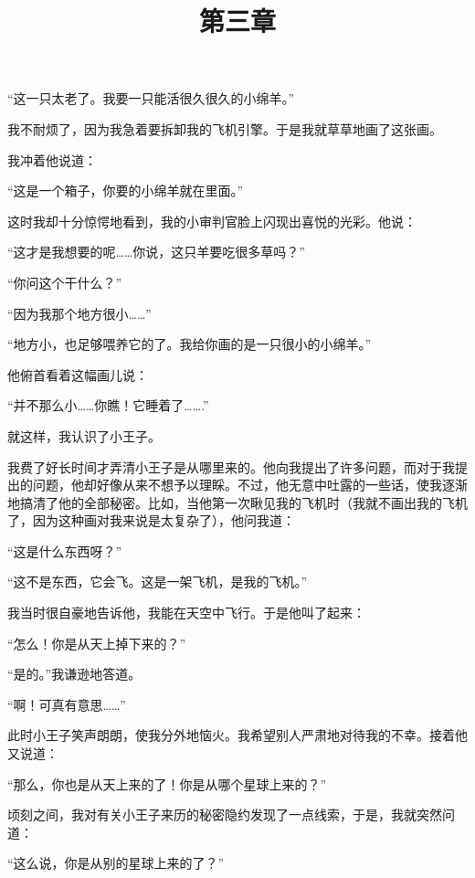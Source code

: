 “这一只太老了。我要一只能活很久很久的小绵羊。”

我不耐烦了，因为我急着要拆卸我的飞机引擎。于是我就草草地画了这张画。

{\startalignment[center]
 \stopalignment}

我冲着他说道：

“这是一个箱子，你要的小绵羊就在里面。”

这时我却十分惊愕地看到，我的小审判官脸上闪现出喜悦的光彩。他说：

“这才是我想要的呢\ldots{}\ldots{}你说，这只羊要吃很多草吗？”

“你问这个干什么？”

“因为我那个地方很小\ldots{}\ldots{}”

“地方小，也足够喂养它的了。我给你画的是一只很小的小绵羊。”

他俯首看着这幅画儿说：

“并不那么小\ldots{}\ldots{}你瞧！它睡着了\ldots{}\ldots{}.”

就这样，我认识了小王子。

\title{第三章}

{\startalignment[center]
 \stopalignment}

我费了好长时间才弄清小王子是从哪里来的。他向我提出了许多问题，而对于我提出的问题，他却好像从来不想予以理睬。不过，他无意中吐露的一些话，使我逐渐地搞清了他的全部秘密。比如，当他第一次瞅见我的飞机时（我就不画出我的飞机了，因为这种画对我来说是太复杂了），他问我道：

“这是什么东西呀？”

“这不是东西，它会飞。这是一架飞机，是我的飞机。”

我当时很自豪地告诉他，我能在天空中飞行。于是他叫了起来：

“怎么！你是从天上掉下来的？”

“是的。”我谦逊地答道。

“啊！可真有意思\ldots{}\ldots{}”

此时小王子笑声朗朗，使我分外地恼火。我希望别人严肃地对待我的不幸。接着他又说道：

“那么，你也是从天上来的了！你是从哪个星球上来的？”

顷刻之间，我对有关小王子来历的秘密隐约发现了一点线索，于是，我就突然问道：

“这么说，你是从别的星球上来的了？”

